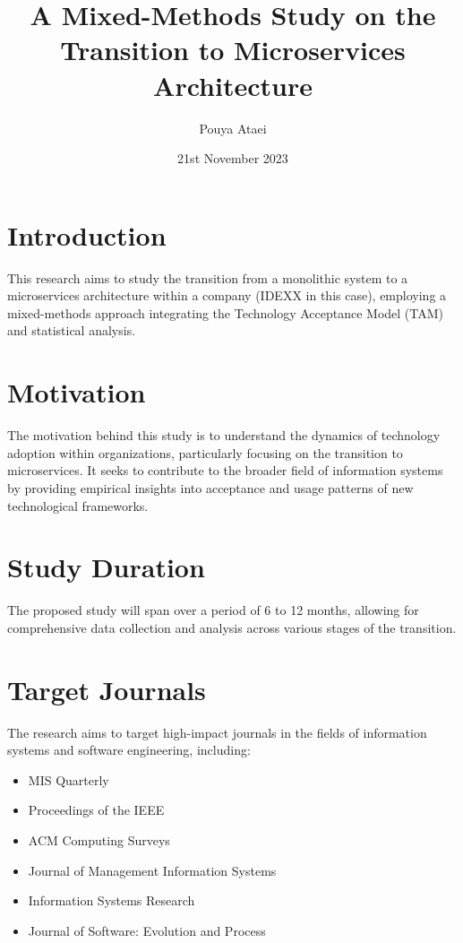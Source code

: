 \documentclass{article}
\title{A Mixed-Methods Study on the Transition to Microservices Architecture}
\author{Pouya Ataei}
\date{21st November 2023}
\begin{document}
\maketitle

\section{Introduction}
\label{sec:introduction}

This research aims to study the transition from a monolithic system to a microservices architecture within a company (IDEXX in this case), employing a mixed-methods approach integrating the Technology Acceptance Model (TAM) and statistical analysis.

\section{Motivation}
\label{sec:motivation}

The motivation behind this study is to understand the dynamics of technology adoption within organizations, particularly focusing on the transition to microservices. It seeks to contribute to the broader field of information systems by providing empirical insights into acceptance and usage patterns of new technological frameworks.

\section{Study Duration}
\label{sec:duration}

The proposed study will span over a period of 6 to 12 months, allowing for comprehensive data collection and analysis across various stages of the transition.

\section{Target Journals}
\label{sec:targetJournals}

The research aims to target high-impact journals in the fields of information systems and software engineering, including:
\begin{itemize}
    \item MIS Quarterly
    \item Proceedings of the IEEE
    \item ACM Computing Surveys
    \item Journal of Management Information Systems
    \item Information Systems Research
    \item Journal of Software: Evolution and Process
\end{itemize}
\end{document}
